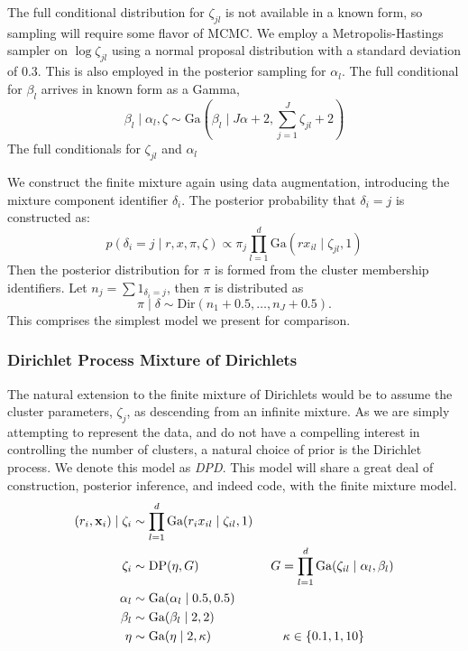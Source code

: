 The full conditional distribution for $\zeta_{jl}$ is not available in a known form, so sampling
  will require some flavor of MCMC.  We employ a Metropolis-Hastings sampler on $\log\zeta_{jl}$
  using a normal proposal distribution with a standard deviation of 0.3.  This is also employed in
  the posterior sampling for $\alpha_l$. The full conditional for $\beta_l$ arrives in known form
  as a Gamma,
  \begin{equation}
    \label{eq:betafc}
    \beta_l\mid \alpha_l, \zeta \sim \text{Ga}(\beta_l \mid J\alpha + 2, \sum_{j = 1}^J\zeta_{jl} + 2)
  \end{equation}
  The full conditionals for $\zeta_{jl}$ and $\alpha_l$ 

We construct the finite mixture again using data augmentation, introducing the mixture component
  identifier $\delta_i$. The posterior probability that $\delta_i = j$ is constructed as:
  \begin{equation}
    \label{eq:finitemix}
    p(\delta_i = j \mid r, x, \pi, \zeta) \propto \pi_j\prod_{l = 1}^d\text{Ga}(rx_{il}\mid\zeta_{jl},1)
  \end{equation}
  Then the posterior distribution for $\pi$ is formed from the cluster membership identifiers.  Let
  $n_j = \sum 1_{\delta_i = j}$, then $\pi$ is distributed as
  \begin{equation}
    \pi \mid \delta \sim \text{Dir}(n_1 + 0.5, \ldots, n_J + 0.5).
  \end{equation}
  This comprises the simplest model we present for comparison.

\subsubsection{Dirichlet Process Mixture of Dirichlets}
\label{model:dpd}
The natural extension to the finite mixture of Dirichlets would be to assume the cluster parameters,
  $\zeta_j$, as descending from an infinite mixture.  As we are simply attempting to represent the
  data, and do not have a compelling interest in controlling the number of clusters, a natural
  choice of prior is the Dirichlet process.  We denote this model as \emph{DPD}.  This model will
  share a great deal of construction, posterior inference, and indeed code, with the finite
  mixture model.
  \begin{equation}
    \label{eq:dpsimplex}
    \begin{aligned}
      (r_i, {\bf x}_i) \mid \zeta_i &\sim \prod_{l = 1}^d\text{Ga}(r_ix_{il}\mid \zeta_{il}, 1)\\
      \zeta_i &\sim \text{DP}(\eta, G)\hspace{2cm}G = \prod_{l = 1}^d \text{Ga}(\zeta_{il}\mid \alpha_l,\beta_l)\\
      \alpha_l &\sim \text{Ga}(\alpha_l \mid 0.5, 0.5)\\
      \beta_l &\sim \text{Ga}(\beta_l \mid 2, 2)\\
      \eta &\sim \text{Ga}(\eta \mid 2, \kappa) \hspace{2cm}\kappa \in \lbrace 0.1, 1, 10\rbrace
    \end{aligned}
  \end{equation}

